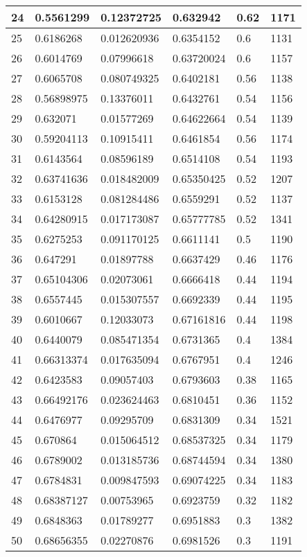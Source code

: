 \begin{longtable}{|l|l|l|l|l|l|}
24 & 0.5561299 & 0.12372725 & 0.632942 & 0.62 & 1171 \\ \hline 
25 & 0.6186268 & 0.012620936 & 0.6354152 & 0.6 & 1131 \\ \hline 
26 & 0.6014769 & 0.07996618 & 0.63720024 & 0.6 & 1157 \\ \hline 
27 & 0.6065708 & 0.080749325 & 0.6402181 & 0.56 & 1138 \\ \hline 
28 & 0.56898975 & 0.13376011 & 0.6432761 & 0.54 & 1156 \\ \hline 
29 & 0.632071 & 0.01577269 & 0.64622664 & 0.54 & 1139 \\ \hline 
30 & 0.59204113 & 0.10915411 & 0.6461854 & 0.56 & 1174 \\ \hline 
31 & 0.6143564 & 0.08596189 & 0.6514108 & 0.54 & 1193 \\ \hline 
32 & 0.63741636 & 0.018482009 & 0.65350425 & 0.52 & 1207 \\ \hline 
33 & 0.6153128 & 0.081284486 & 0.6559291 & 0.52 & 1137 \\ \hline 
34 & 0.64280915 & 0.017173087 & 0.65777785 & 0.52 & 1341 \\ \hline 
35 & 0.6275253 & 0.091170125 & 0.6611141 & 0.5 & 1190 \\ \hline 
36 & 0.647291 & 0.01897788 & 0.6637429 & 0.46 & 1176 \\ \hline 
37 & 0.65104306 & 0.02073061 & 0.6666418 & 0.44 & 1194 \\ \hline 
38 & 0.6557445 & 0.015307557 & 0.6692339 & 0.44 & 1195 \\ \hline 
39 & 0.6010667 & 0.12033073 & 0.67161816 & 0.44 & 1198 \\ \hline 
40 & 0.6440079 & 0.085471354 & 0.6731365 & 0.4 & 1384 \\ \hline 
41 & 0.66313374 & 0.017635094 & 0.6767951 & 0.4 & 1246 \\ \hline 
42 & 0.6423583 & 0.09057403 & 0.6793603 & 0.38 & 1165 \\ \hline 
43 & 0.66492176 & 0.023624463 & 0.6810451 & 0.36 & 1152 \\ \hline 
44 & 0.6476977 & 0.09295709 & 0.6831309 & 0.34 & 1521 \\ \hline 
45 & 0.670864 & 0.015064512 & 0.68537325 & 0.34 & 1179 \\ \hline 
46 & 0.6789002 & 0.013185736 & 0.68744594 & 0.34 & 1380 \\ \hline 
47 & 0.6784831 & 0.009847593 & 0.69074225 & 0.34 & 1183 \\ \hline 
48 & 0.68387127 & 0.00753965 & 0.6923759 & 0.32 & 1182 \\ \hline 
49 & 0.6848363 & 0.01789277 & 0.6951883 & 0.3 & 1382 \\ \hline 
50 & 0.68656355 & 0.02270876 & 0.6981526 & 0.3 & 1191 \\ \hline 
\end{longtable}